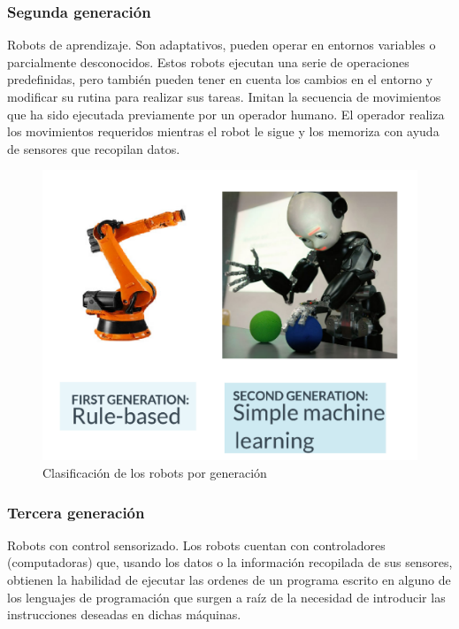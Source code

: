        \subsubsection{Segunda generación}
            Robots de aprendizaje. Son adaptativos, pueden operar en entornos variables o parcialmente desconocidos. Estos robots ejecutan una serie de operaciones predefinidas, pero también pueden tener en cuenta los cambios en el entorno y modificar su rutina para realizar sus tareas. Imitan la secuencia de movimientos que ha sido ejecutada previamente por un operador humano. El operador realiza los movimientos requeridos mientras el robot le sigue y los memoriza con ayuda de sensores que recopilan datos.
            
    
            \begin{figure}[htb]
            \centering
            \includegraphics[width=0.9\linewidth]{Main/Chapter2/Images2/Clasificacion-de-los-robots-por-generacion_b.png}
            \caption{Clasificación de los robots por generación}
            \label{f:Cap2_general_5b}
        \end{figure}
        
        \newpage
        
        \subsubsection{Tercera generación}
            Robots con control sensorizado. Los robots cuentan con controladores (computadoras) que, usando los datos o la información recopilada de sus sensores, obtienen la habilidad de ejecutar las ordenes de un programa escrito en alguno de los lenguajes de programación que surgen a raíz de la necesidad de introducir las instrucciones deseadas en dichas máquinas. 
